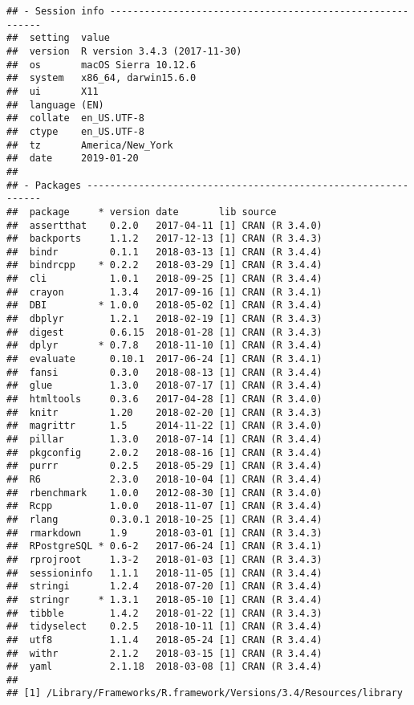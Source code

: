 \documentclass[]{article}
\begin{document}
\begin{verbatim}
## - Session info ----------------------------------------------------------
##  setting  value                       
##  version  R version 3.4.3 (2017-11-30)
##  os       macOS Sierra 10.12.6        
##  system   x86_64, darwin15.6.0        
##  ui       X11                         
##  language (EN)                        
##  collate  en_US.UTF-8                 
##  ctype    en_US.UTF-8                 
##  tz       America/New_York            
##  date     2019-01-20                  
## 
## - Packages --------------------------------------------------------------
##  package     * version date       lib source        
##  assertthat    0.2.0   2017-04-11 [1] CRAN (R 3.4.0)
##  backports     1.1.2   2017-12-13 [1] CRAN (R 3.4.3)
##  bindr         0.1.1   2018-03-13 [1] CRAN (R 3.4.4)
##  bindrcpp    * 0.2.2   2018-03-29 [1] CRAN (R 3.4.4)
##  cli           1.0.1   2018-09-25 [1] CRAN (R 3.4.4)
##  crayon        1.3.4   2017-09-16 [1] CRAN (R 3.4.1)
##  DBI         * 1.0.0   2018-05-02 [1] CRAN (R 3.4.4)
##  dbplyr        1.2.1   2018-02-19 [1] CRAN (R 3.4.3)
##  digest        0.6.15  2018-01-28 [1] CRAN (R 3.4.3)
##  dplyr       * 0.7.8   2018-11-10 [1] CRAN (R 3.4.4)
##  evaluate      0.10.1  2017-06-24 [1] CRAN (R 3.4.1)
##  fansi         0.3.0   2018-08-13 [1] CRAN (R 3.4.4)
##  glue          1.3.0   2018-07-17 [1] CRAN (R 3.4.4)
##  htmltools     0.3.6   2017-04-28 [1] CRAN (R 3.4.0)
##  knitr         1.20    2018-02-20 [1] CRAN (R 3.4.3)
##  magrittr      1.5     2014-11-22 [1] CRAN (R 3.4.0)
##  pillar        1.3.0   2018-07-14 [1] CRAN (R 3.4.4)
##  pkgconfig     2.0.2   2018-08-16 [1] CRAN (R 3.4.4)
##  purrr         0.2.5   2018-05-29 [1] CRAN (R 3.4.4)
##  R6            2.3.0   2018-10-04 [1] CRAN (R 3.4.4)
##  rbenchmark    1.0.0   2012-08-30 [1] CRAN (R 3.4.0)
##  Rcpp          1.0.0   2018-11-07 [1] CRAN (R 3.4.4)
##  rlang         0.3.0.1 2018-10-25 [1] CRAN (R 3.4.4)
##  rmarkdown     1.9     2018-03-01 [1] CRAN (R 3.4.3)
##  RPostgreSQL * 0.6-2   2017-06-24 [1] CRAN (R 3.4.1)
##  rprojroot     1.3-2   2018-01-03 [1] CRAN (R 3.4.3)
##  sessioninfo   1.1.1   2018-11-05 [1] CRAN (R 3.4.4)
##  stringi       1.2.4   2018-07-20 [1] CRAN (R 3.4.4)
##  stringr     * 1.3.1   2018-05-10 [1] CRAN (R 3.4.4)
##  tibble        1.4.2   2018-01-22 [1] CRAN (R 3.4.3)
##  tidyselect    0.2.5   2018-10-11 [1] CRAN (R 3.4.4)
##  utf8          1.1.4   2018-05-24 [1] CRAN (R 3.4.4)
##  withr         2.1.2   2018-03-15 [1] CRAN (R 3.4.4)
##  yaml          2.1.18  2018-03-08 [1] CRAN (R 3.4.4)
## 
## [1] /Library/Frameworks/R.framework/Versions/3.4/Resources/library
\end{verbatim}
\end{document}

